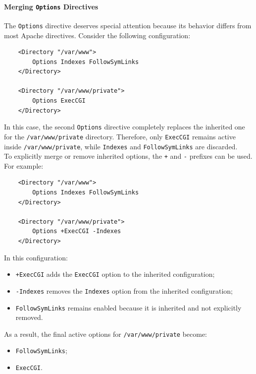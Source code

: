 \documentclass{scrbook}
\begin{document}
	\paragraph{Merging \texttt{Options} Directives}
	
	The \texttt{Options} directive deserves special attention because its behavior differs from most Apache directives. Consider the following configuration:
	
	\begin{lstlisting}
	<Directory "/var/www">
		Options Indexes FollowSymLinks
	</Directory>
		
	<Directory "/var/www/private">
		Options ExecCGI
	</Directory>
	\end{lstlisting}
	
	In this case, the second \texttt{Options} directive completely replaces the inherited one for the \texttt{/var/www/private} directory. Therefore, only \texttt{ExecCGI} remains active inside \texttt{/var/www/private}, while \texttt{Indexes} and \texttt{FollowSymLinks} are discarded.\\
	
	To explicitly merge or remove inherited options, the \texttt{+} and \texttt{-} prefixes can be used. For example:
	
	\begin{lstlisting}
	<Directory "/var/www">
		Options Indexes FollowSymLinks
	</Directory>
		
	<Directory "/var/www/private">
		Options +ExecCGI -Indexes
	</Directory>
	\end{lstlisting}
	
	In this configuration:
	\begin{itemize}
		\item \texttt{+ExecCGI} adds the \texttt{ExecCGI} option to the inherited configuration;
		
		\item \texttt{-Indexes} removes the \texttt{Indexes} option from the inherited configuration;
		
		\item \texttt{FollowSymLinks} remains enabled because it is inherited and not explicitly removed.
	\end{itemize}
	
	As a result, the final active options for \texttt{/var/www/private} become:
	
	\begin{itemize}
		\item \texttt{FollowSymLinks};
		\item \texttt{ExecCGI}.
	\end{itemize}
	
\end{document}
